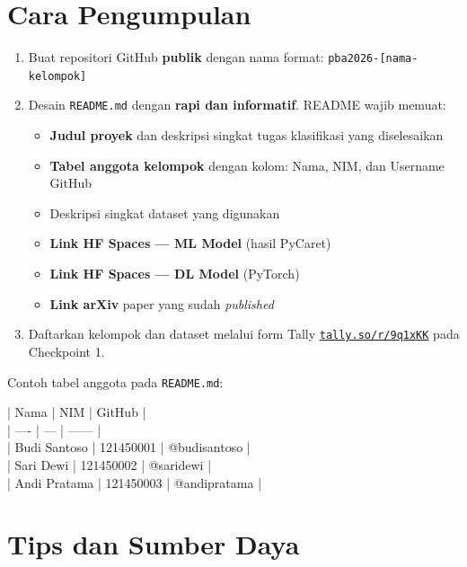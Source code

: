 \documentclass[11pt,a4paper]{article}
\begin{document}
\section{Cara Pengumpulan}

\begin{enumerate}
  \item Buat repositori GitHub \textbf{publik} dengan nama format: \texttt{pba2026-[nama-kelompok]}
  \item Desain \texttt{README.md} dengan \textbf{rapi dan informatif}. README wajib memuat:
  \begin{itemize}[noitemsep]
    \item \textbf{Judul proyek} dan deskripsi singkat tugas klasifikasi yang diselesaikan
    \item \textbf{Tabel anggota kelompok} dengan kolom: Nama, NIM, dan Username GitHub
    \item Deskripsi singkat dataset yang digunakan
    \item \textbf{Link HF Spaces --- ML Model} (hasil PyCaret)
    \item \textbf{Link HF Spaces --- DL Model} (PyTorch)
    \item \textbf{Link arXiv} paper yang sudah \textit{published}
  \end{itemize}
  \item Daftarkan kelompok dan dataset melalui form Tally \href{https://tally.so/r/9q1xKK}{\texttt{tally.so/r/9q1xKK}} pada Checkpoint 1.
\end{enumerate}

Contoh tabel anggota pada \texttt{README.md}:

\begin{tcolorbox}[colback=lightgray,colframe=itera!40,fontupper=\small\ttfamily]
| Nama | NIM | GitHub |\\
| ---- | --- | ------ |\\
| Budi Santoso | 121450001 | @budisantoso |\\
| Sari Dewi | 121450002 | @saridewi |\\
| Andi Pratama | 121450003 | @andipratama |
\end{tcolorbox}

\section{Tips dan Sumber Daya}
\end{document}
